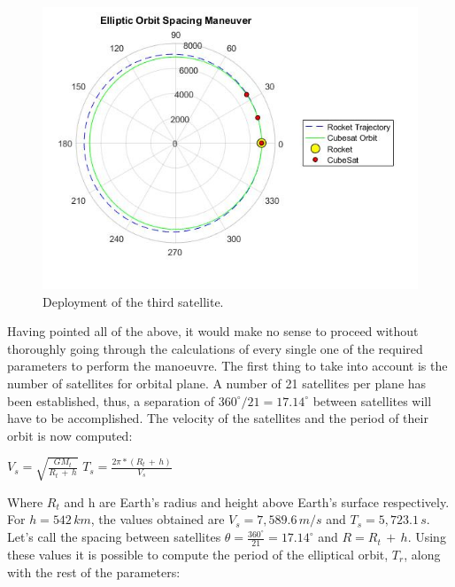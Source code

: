 \begin{figure}[H]
\includegraphics[scale=0.7]{./sections/Constellation_Deployment/S4-First_Placement/Images_S4/Picture_7_S4.jpg}
\caption{Deployment of the third satellite.}
\label{orbit5}
\end{figure}
Having pointed all of the above, it would make no sense to proceed without thoroughly going through the calculations of every single one of the required parameters to perform the manoeuvre. The first thing to take into account is the number of satellites for orbital plane. A number of 21 satellites per plane has been established, thus, a separation of $360^\circ/21 = 17.14^\circ$ between satellites will have to be accomplished. The velocity of the satellites and the period of their orbit is now computed:
\newline
\begin{center}
$V_s = \sqrt{\frac{GM_t}{R_t\,+\,h}} $
\newline\newline
$T_s = \frac{2\pi*(R_t\,+\,h)}{V_s}$\newline
\end{center}
Where $R_t$ and h are Earth's radius and height above Earth's surface respectively. For $h = 542 \,km$, the values obtained are $V_s = 7,589.6 \,m/s$ and $T_s = 5,723.1 \,s$. Let's call the spacing between satellites $\theta = \frac{360^\circ}{21} = 17.14^\circ$ and $R = R_t \,+ \,h$. Using these values it is possible to compute the period of the elliptical orbit, $T_r$, along with the rest of the parameters:
\newline
